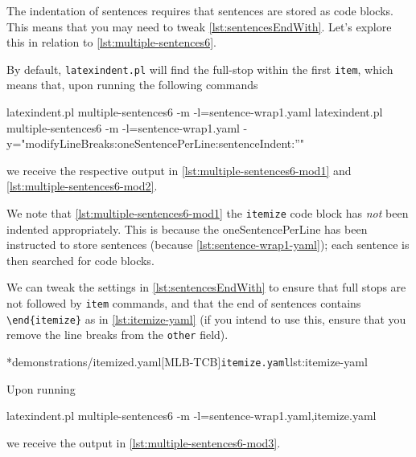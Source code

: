 	The indentation of sentences requires that sentences are stored as code blocks. This
	means that you may need to tweak \vref{lst:sentencesEndWith}. Let's explore this in
	relation to \cref{lst:multiple-sentences6}.


	By default, \texttt{latexindent.pl} will find the full-stop within the first
	\texttt{item}, which means that, upon running the following commands
	\begin{commandshell}
latexindent.pl multiple-sentences6 -m -l=sentence-wrap1.yaml 
latexindent.pl multiple-sentences6 -m -l=sentence-wrap1.yaml -y="modifyLineBreaks:oneSentencePerLine:sentenceIndent:''"
\end{commandshell}
	we receive the respective output in \cref{lst:multiple-sentences6-mod1} and
	\cref{lst:multiple-sentences6-mod2}.



	We note that \cref{lst:multiple-sentences6-mod1} the \texttt{itemize} code block has
	\emph{not} been indented appropriately. This is because the
	oneSentencePerLine has been instructed to store sentences (because
	\cref{lst:sentence-wrap1-yaml}); each sentence is then searched for code blocks.

	We can tweak the settings in \vref{lst:sentencesEndWith} to ensure that full stops are
	not followed by \texttt{item} commands, and that the end of sentences
	contains \lstinline!\end{itemize}! as in \cref{lst:itemize-yaml} (if you intend to use this, ensure that you
	remove the line breaks from the \texttt{other} field).

	\cmhlistingsfromfile[style=yaml-LST]*{demonstrations/itemized.yaml}[MLB-TCB]{\texttt{itemize.yaml}}{lst:itemize-yaml}

	Upon running
	\begin{commandshell}
latexindent.pl multiple-sentences6 -m -l=sentence-wrap1.yaml,itemize.yaml
\end{commandshell}
	we receive the output in \cref{lst:multiple-sentences6-mod3}.

